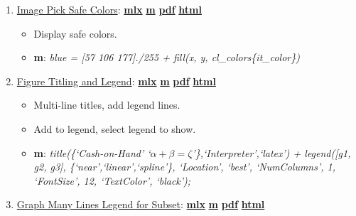 \documentclass[
]{book}
\providecommand{\tightlist}{%
  \setlength{\itemsep}{0pt}\setlength{\parskip}{0pt}}
\begin{document}
\begin{enumerate}
\def\labelenumi{\arabic{enumi}.}
\tightlist
\item
  \href{https://fanwangecon.github.io/M4Econ/graph/tools/htmlpdfm/fs_color.html}{Image Pick Safe Colors}: \href{https://github.com/FanWangEcon/M4Econ/blob/master/graph/tools/fs_color.mlx}{\textbf{mlx}} \textbar{} \href{https://github.com/FanWangEcon/M4Econ/blob/master/graph/tools/htmlpdfm/fs_color.m}{\textbf{m}} \textbar{} \href{https://github.com/FanWangEcon/M4Econ/blob/master/graph/tools/htmlpdfm/fs_color.pdf}{\textbf{pdf}} \textbar{} \href{https://fanwangecon.github.io/M4Econ/graph/tools/htmlpdfm/fs_color.html}{\textbf{html}}

  \begin{itemize}
  \tightlist
  \item
    Display safe colors.
  \item
    \textbf{m}: \emph{blue = {[}57 106 177{]}./255 + fill(x, y, cl\_colors\{it\_color\})}
  \end{itemize}
\item
  \href{https://fanwangecon.github.io/M4Econ/graph/tools/htmlpdfm/fs_titling.html}{Figure Titling and Legend}: \href{https://github.com/FanWangEcon/M4Econ/blob/master/graph/tools/fs_titling.mlx}{\textbf{mlx}} \textbar{} \href{https://github.com/FanWangEcon/M4Econ/blob/master/graph/tools/htmlpdfm/fs_titling.m}{\textbf{m}} \textbar{} \href{https://github.com/FanWangEcon/M4Econ/blob/master/graph/tools/htmlpdfm/fs_titling.pdf}{\textbf{pdf}} \textbar{} \href{https://fanwangecon.github.io/M4Econ/graph/tools/htmlpdfm/fs_titling.html}{\textbf{html}}

  \begin{itemize}
  \tightlist
  \item
    Multi-line titles, add legend lines.
  \item
    Add to legend, select legend to show.
  \item
    \textbf{m}: \emph{title(\{`Cash-on-Hand' `\(\alpha + \beta = \zeta\)'\},`Interpreter',`latex') + legend({[}g1, g2, g3{]}, \{`near',`linear',`spline'\}, `Location', `best', `NumColumns', 1, `FontSize', 12, `TextColor', `black');}
  \end{itemize}
\item
  \href{https://fanwangecon.github.io/M4Econ/graph/tools/htmlpdfm/fs_legendsubset.html}{Graph Many Lines Legend for Subset}: \href{https://github.com/FanWangEcon/M4Econ/blob/master/graph/tools/fs_legendsubset.mlx}{\textbf{mlx}} \textbar{} \href{https://github.com/FanWangEcon/M4Econ/blob/master/graph/tools/htmlpdfm/fs_legendsubset.m}{\textbf{m}} \textbar{} \href{https://github.com/FanWangEcon/M4Econ/blob/master/graph/tools/htmlpdfm/fs_legendsubset.pdf}{\textbf{pdf}} \textbar{} \href{https://fanwangecon.github.io/M4Econ/graph/tools/htmlpdfm/fs_legendsubset.html}{\textbf{html}}


\end{enumerate}
\end{document}
